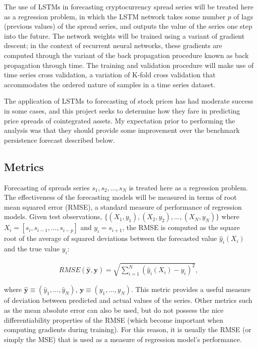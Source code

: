 \documentclass{article}
\begin{document}
The use of LSTMs in forecasting cryptocurrency spread series will be treated here as a regression problem, in which the LSTM network takes some number $p$ of lags (previous values) of the spread series, and outputs the value of the series one step into the future. The network weights will be trained using a variant of gradient descent; in the context of recurrent neural networks, these gradients are computed through the variant of the back propagation procedure known as back propagation through time. The training and validation procedure will make use of time series cross validation, a variation of K-fold cross validation that accommodates the ordered nature of samples in a time series dataset.  

The application of LSTMs to forecasting of stock prices has had moderate success in some cases, and this project seeks to determine how they fare in predicting price spreads of cointegrated assets. My expectation prior to performing the analysis was that they should provide some improvement over the benchmark persistence forecast described below. 



\subsection{Metrics}

Forecasting of spreads series $s_{1}, s_{2}, ..., s_{N}$ is treated here as a regression problem. The effectiveness of the forecasting models will be measured in terms of root mean squared error (RMSE), a standard measure of performance of regression models. Given test observations, 
$\{(X_{1}, y_{1}), (X_{2}, y_{2}), ...,  (X_{N}, y_{N}) \}$ where $X_{i} = [s_{i}, s_{i-1}, ..., s_{i-p}]$ and $y_{i} = s_{i+1}$,
the RMSE is computed as the square root of the average of squared deviations between the forecasted value $\hat{y}_{i}(X_{i})$ and the true value $y_{i}$:

\begin{align}
RMSE(\boldsymbol{\hat{y}}, \boldsymbol{y}) = \sqrt{\sum_{i=1}^{N} \left(\hat{y}_{i}(X_{i}) - y_{i}\right)^{2} },
\end{align}

\noindent where $\boldsymbol{\hat{y}} \equiv (\hat{y}_{1}, ... , \hat{y}_{N})$, $\boldsymbol{y} \equiv (y_{1}, ... , y_{N})$. This metric provides a useful measure of deviation between predicted and actual values of the series. Other metrics such as the mean absolute error can also be used, but do not possess the nice differentiability properties of the RMSE (which become important when computing gradients during training). For this reason, it is usually the RMSE (or simply the MSE) that is used as a measure of regression model's performance. 
\end{document}

